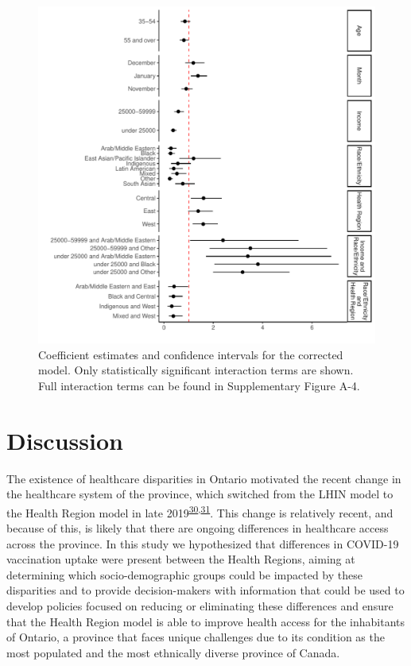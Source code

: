 \documentclass[
  letterpaper,
  DIV=11,
  numbers=noendperiod]{scrartcl}
\begin{document}
\begin{figure}

\includegraphics{main_files/figure-pdf/fig-model-corr-1.pdf} \hfill{}

\caption{\label{fig-model-corr}Coefficient estimates and confidence
intervals for the corrected model. Only statistically significant
interaction terms are shown. Full interaction terms can be found in
Supplementary Figure A-4.}

\end{figure}

\hypertarget{discussion}{%
\section{Discussion}\label{discussion}}

The existence of healthcare disparities in Ontario motivated the recent
change in the healthcare system of the province, which switched from the
LHIN model to the Health Region model in late
2019\textsuperscript{\protect\hyperlink{ref-tsasis2012}{30},\protect\hyperlink{ref-dong2022}{31}}.
This change is relatively recent, and because of this, is likely that
there are ongoing differences in healthcare access across the province.
In this study we hypothesized that differences in COVID-19 vaccination
uptake were present between the Health Regions, aiming at determining
which socio-demographic groups could be impacted by these disparities
and to provide decision-makers with information that could be used to
develop policies focused on reducing or eliminating these differences
and ensure that the Health Region model is able to improve health access
for the inhabitants of Ontario, a province that faces unique challenges
due to its condition as the most populated and the most ethnically
diverse province of Canada.
\end{document}
